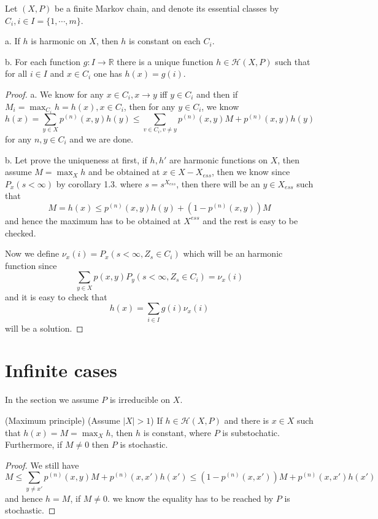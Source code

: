 \documentclass[lang=en,11pt,a4paper,citestyle =authoryear]{elegantpaper}
\newcommand{\R}{\mathbb{R}}
\newcommand{\Har}{\mathcal{H}}
\begin{document}
\begin{theorem}
    Let $(X,P)$ be a finite Markov chain, and denote its essential classes by $C_i, i\in I=\{1,\cdots,m\}$.\par
    a. If $h$ is harmonic on $X$, then $h$ is constant on each $C_i$.\par
    b. For each function $g:I\to\R$ there is a unique function $h\in\Har(X,P)$ such that for all $i\in I$ and $x\in C_i$ one has $h(x) = g(i)$.
\end{theorem}
\begin{proof}
    a. We know for any $x\in C_i, x\to y$ iff $y\in C_i$ and then if $M_i = \max_{C_i} h = h(x), x\in C_i$, then for any $y\in C_i$, we know
    \[
    h(x) = \sum\limits_{y\in X}p^{(n)}(x,y)h(y) \leq \sum\limits_{v\in C_i,v\neq y}p^{(n)}(x,y) M + p^{(n)}(x,y)h(y)
    \]
    for any $n,y\in C_i$ and we are done.\par
    b. Let prove the uniqueness at first, if $h,h'$ are harmonic functions on $X$, then assume $M = \max_{X}h$ and be obtained at $x \in X - X_{ess}$, then we know since $P_x(s<\infty)$ by corollary 1.3. where $s = s^{X_{ess}}$, then there will be an $y\in X_{ess}$ such that
    \[
    M = h(x) \leq p^{(n)}(x,y)h(y)+(1-p^{(n)}(x,y))M
    \] 
    and hence the maximum has to be obtained at $X^{ess}$ and the rest is easy to be checked.\par
    Now we define $\nu_x(i) = P_x(s<\infty, Z_s \in C_i)$ which will be an harmonic function since
    \[
    \sum\limits_{y\in X}p(x,y)P_y(s<\infty, Z_s\in C_i) = \nu_x(i)
    \]
    and it is easy to check that
    \[h(x) = \sum\limits_{i\in I}g(i)\nu_x(i)\]
    will be a solution.
\end{proof} 

\section{Infinite cases}

In the section we assume $P$ is irreducible on $X$.

\begin{lemma}
    (Maximum principle) (Assume $|X| > 1$) If $h\in\Har(X,P)$ and there is $x\in X$ such that $h(x) = M = \max_X h$, then $h$ is constant, where $P$ is substochatic. Furthermore, if $M\neq 0$ then $P$ is stochastic.
\end{lemma}
\begin{proof}
    We still have
    \[
    M \leq \sum\limits_{y\neq x'}p^{(n)}(x,y)M + p^{(n)}(x,x')h(x') \leq (1-p^{(n)}(x,x'))M + p^{(n)}(x,x')h(x')
    \]
    and hence $h = M$, if $M\neq 0$. we know the equality has to be reached by $P$ is stochastic.
\end{proof}
\end{document}
